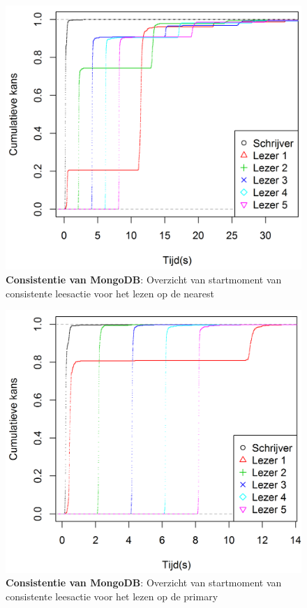 \begin{figure}[ht!] 
	\centering
	\includegraphics[width=.70\textwidth]{img/Observaties/MongoDB/ECDF-plot-Start-updateRawData-majority-nearest-1}
	\caption{\textbf{Consistentie van MongoDB}: Overzicht van startmoment van consistente leesactie voor het lezen op de nearest }
	\label{fig:consistentie-mongodb-nearest}
\end{figure}
\begin{figure}[htb!] 
	\centering
	\includegraphics[width=.70\textwidth]{img/Observaties/MongoDB/ECDF-plot-Start-updateRawData-majority-primary-1}
	\caption{\textbf{Consistentie van MongoDB}: Overzicht van startmoment van consistente leesactie voor het lezen op de primary }
	\label{fig:consistentie-mongodb-primary}
\end{figure}
